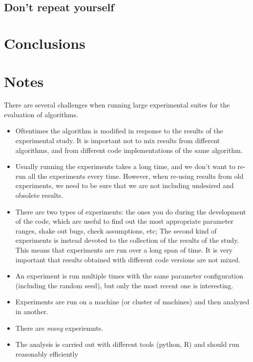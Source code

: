 \documentclass{llncs}
\begin{document}
\subsection{Don't repeat yourself}

\section{Conclusions}




\appendix

\section{Notes}

There are several challenges when running large experimental suites
for the evaluation of algorithms.

\begin{itemize}
\item Oftentimes the algorithm is modified in response to the results
  of the experimental study. It is important not to mix results from
  different algorithms, and from different code implementations of the
  same algorithm.
\item Usually running the experiments takes a long time, and we don't
  want to re-run all the experiments every time. However, when
  re-using results from old experiments, we need to be sure that we
  are not including undesired and obsolete results.
\item There are two types of experiments: the ones you do during the
  development of the code, which are useful to find out the most
  appropriate parameter ranges, shake out bugs, check assumptions,
  etc; The second kind of experiments is instead devoted to the
  collection of the results of the study. This means that experiments
  are run over a long span of time. It is very important that results
  obtained with different code versions are not mixed.
\item An experiment is run multiple times with the same parameter
  configuration (including the random seed), but only the most recent
  one is interesting.
\item Experiments are run on a machine (or cluster of machines) and then
  analyzed in another.
\item There are \emph{many} experiemnts.
\item The analysis is carried out with different tools (python, R) and
  should run reasonably efficiently
\end{itemize}
\end{document}
